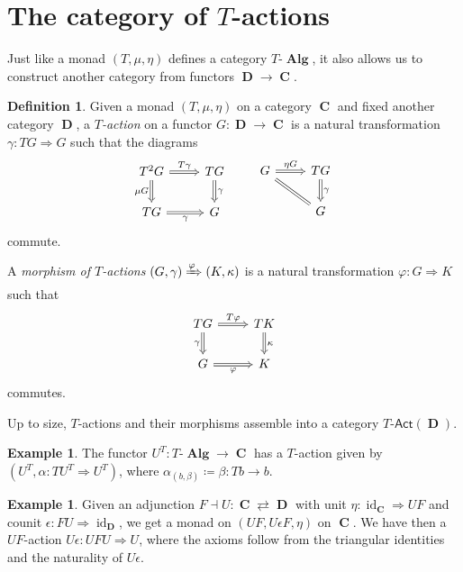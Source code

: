 \documentclass[a4paper,11pt,twoside, openany]{book}
\DeclareMathOperator{\Alg}{\mathbf{Alg}}
\DeclareMathOperator{\C}{\mathbf{C}}
\DeclareMathOperator{\D}{\mathbf{D}}
\DeclareMathOperator{\id}{id}
\theoremstyle{definition}
\theoremstyle{definition}
\newtheorem{defn}[thm]{Definition} %
\newtheorem{exmp}[thm]{Example} %
\theoremstyle{remark}
\begin{document}
	
	\section{The category of $T$-actions}
	
	Just like a monad $(T,\mu,\eta)$ defines a category $T\mbox{-}\Alg$, it also allows us to construct another category from functors $\D\rightarrow\C$.
	
	\begin{defn}
		Given a monad $(T,\mu,\eta)$ on a category $\C$ and fixed another category $\D$, a \emph{$T$-action} on a functor $G\colon\D\to\C$ is a natural transformation $\gamma\colon TG\Rightarrow G$ such that the diagrams
		\[
		\begin{tikzcd}
		T^2G\ar["\mu G"', Rightarrow]{d}\ar["T\gamma", 	Rightarrow]{r}
		& TG\ar["\gamma", Rightarrow]{d} \\
		TG\ar["\gamma"', Rightarrow]{r}
		& G
		\end{tikzcd}
		\quad\quad
		\begin{tikzcd}
		G\ar["\eta G", Rightarrow]{r}\ar[equal]{dr}
		& TG\ar["\gamma", Rightarrow]{d}\\
		& G
		\end{tikzcd}
		\]
		commute.
		
		A \emph{morphism of $T$-actions} $(G,\gamma)\xRightarrow{\varphi}(K,\kappa)$ is a natural transformation $\varphi\colon G\Rightarrow K$ such that
		\[
		\begin{tikzcd}
		TG\ar["T\varphi", Rightarrow]{r}\ar["\gamma"', Rightarrow]{d}
		& TK\ar["\kappa", Rightarrow]{d}\\
		G\ar[r, Rightarrow, "\varphi"']& K 
		\end{tikzcd}
		\]
		commutes.
		
		Up to size, $T$-actions and their morphisms assemble into a category $T\mbox{-}\mathsf{Act}(\D)$.
	\end{defn}
	
	
	
	\begin{exmp}
		The functor $U^T\colon T\mbox{-}\Alg\rightarrow\C$ has a $T$-action given by $(U^T,\alpha\colon TU^T\Rightarrow U^T)$, where $\alpha_{(b,\beta)}\coloneqq\beta\colon Tb\rightarrow b$.
	\end{exmp}
	
	\begin{exmp}
		Given an adjunction  $F\dashv U\colon\C\rightleftarrows\D$ with unit $\eta\colon\id_{\C}\Rightarrow UF$ and counit $\epsilon\colon FU\Rightarrow\id_{\D}$, we get a monad on $(UF,U\epsilon F,\eta)$ on $\C$. We have then a $UF$-action $U\epsilon\colon UFU\Rightarrow U$, where the axioms follow from the triangular identities and the naturality of $U\epsilon$.
	\end{exmp}
	
\end{document}
